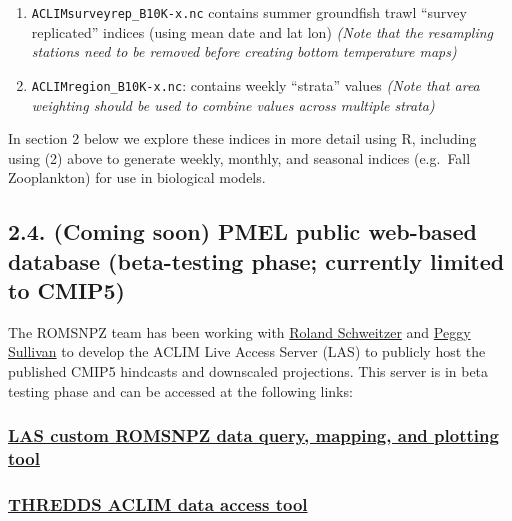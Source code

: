 \documentclass[
]{article}
\providecommand{\tightlist}{%
  \setlength{\itemsep}{0pt}\setlength{\parskip}{0pt}}
\begin{document}
\begin{enumerate}
\def\labelenumi{\arabic{enumi})}
\tightlist
\item
  \texttt{ACLIMsurveyrep\_B10K-x.nc} contains summer groundfish trawl
  ``survey replicated'' indices (using mean date and lat lon)
  \emph{(Note that the resampling stations need to be removed before
  creating bottom temperature maps)}\\
\item
  \texttt{ACLIMregion\_B10K-x.nc}: contains weekly ``strata'' values
  \emph{(Note that area weighting should be used to combine values
  across multiple strata)}
\end{enumerate}

In section 2 below we explore these indices in more detail using R,
including using (2) above to generate weekly, monthly, and seasonal
indices (e.g.~Fall Zooplankton) for use in biological models.

\hypertarget{coming-soon-pmel-public-web-based-database-beta-testing-phase-currently-limited-to-cmip5}{%
\subsection{2.4. (Coming soon) PMEL public web-based database
(beta-testing phase; currently limited to
CMIP5)}\label{coming-soon-pmel-public-web-based-database-beta-testing-phase-currently-limited-to-cmip5}}

The ROMSNPZ team has been working with
\href{roland.schweitzer@noaa.gov}{Roland Schweitzer} and
\href{peggy.sullivan@noaa.gov}{Peggy Sullivan} to develop the ACLIM Live
Access Server (LAS) to publicly host the published CMIP5 hindcasts and
downscaled projections. This server is in beta testing phase and can be
accessed at the following links:

\hypertarget{las-custom-romsnpz-data-query-mapping-and-plotting-tool}{%
\subsubsection{\texorpdfstring{\href{https://data.pmel.noaa.gov/aclim/las/}{LAS
custom ROMSNPZ data query, mapping, and plotting
tool}}{LAS custom ROMSNPZ data query, mapping, and plotting tool}}\label{las-custom-romsnpz-data-query-mapping-and-plotting-tool}}

\hypertarget{thredds-aclim-data-access-tool}{%
\subsubsection{\texorpdfstring{\href{https://data.pmel.noaa.gov/aclim/thredds/}{THREDDS
ACLIM data access
tool}}{THREDDS ACLIM data access tool}}\label{thredds-aclim-data-access-tool}}
\end{document}
